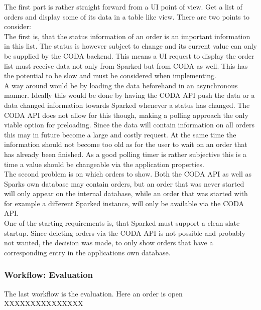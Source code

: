 The first part is rather straight forward from a UI point of view. Get a list of orders and display some of its data in a table like view. 
There are two points to consider:\\
The first is, that the status information of an order is an important information in this list. The status is however subject to change and its current value can only be supplied by the CODA backend. This means a UI request to display the order list must receive data not only from Sparked but from CODA as well. This has the potential to be slow and must be considered when implementing. \\
A way around would be by loading the data beforehand in an asynchronous manner. Ideally this would be done by having the CODA API push the data or a data changed information towards Sparked whenever a status has changed. The CODA API does not allow for this though, making a polling approach the only viable option for preloading. Since the data will contain information on all orders this may in future become a large and costly request. At the same time the information should not become too old as for the user to wait on an order that has already been finished. As a good polling timer is rather subjective this is a time a value should be changeable via the application properties.\\
The second problem is on which orders to show. Both the CODA API as well as Sparks own database may contain orders, but an order that was never started will only appear on the internal database, while an order that was started with for example a different Sparked instance, will only be available via the CODA API. \\
One of the starting requirements is, that Sparked must support a clean slate startup. Since deleting orders via the CODA API is not possible and probably not wanted, the decision was made, to only show orders that have a corresponding entry in the applications own database. 

\subsubsection{Workflow: Evaluation}
The last workflow is the evaluation. Here an order is open XXXXXXXXXXXXXXX

